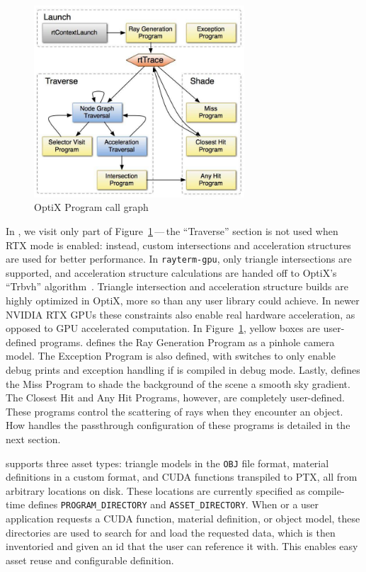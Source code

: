 \vspace{0.3em}
\begin{figure}[htb]
  \centering
  \includegraphics[width=0.7\textwidth]{resources/optix_trace}
  \caption{OptiX Program call graph}
\label{fig:rayterm-gpu_optix_trace}
\end{figure}

In \name{}, we visit only part of Figure~\ref{fig:rayterm-gpu_optix_trace}\,---\,the ``Traverse'' section is not used when RTX mode is enabled: instead, custom intersections and acceleration structures are used for better performance.
In \texttt{rayterm-gpu}, only triangle intersections are supported, and acceleration structure calculations are handed off to OptiX's ``Trbvh'' algorithm~\cite{karras2013fast}.
Triangle intersection and acceleration structure builds are highly optimized in OptiX, more so than any user library could achieve.
In newer NVIDIA RTX GPUs these constraints also enable real hardware acceleration, as opposed to GPU accelerated computation.
In Figure~\ref{fig:rayterm-gpu_optix_trace}, yellow boxes are user-defined programs.
 \name{} defines the Ray Generation Program as a pinhole camera model.
The Exception Program is also defined, with switches to only enable debug prints and exception handling if \name{} is compiled in debug mode.
Lastly, \name{} defines the Miss Program to shade the background of the scene a smooth sky gradient.
The Closest Hit and Any Hit Programs, however, are completely user-defined.
These programs control the scattering of rays when they encounter an object.
How \name{} handles the passthrough configuration of these programs is detailed in the next section.

\name{} supports three asset types: triangle models in the \texttt{OBJ} file format, material definitions in a custom format, and CUDA functions transpiled to PTX, all from arbitrary locations on disk.
These locations are currently specified as compile-time defines \texttt{PROGRAM\_DIRECTORY} and \texttt{ASSET\_DIRECTORY}.
When \name{} or a user application requests a CUDA function, material definition, or object model, these directories are used to search for and load the requested data, which is then inventoried and given an id that the user can reference it with.
This enables easy asset reuse and configurable definition.


